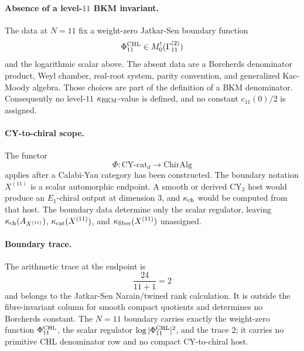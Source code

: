 \paragraph{Absence of a level-\(11\) BKM invariant.}
The data at \(N=11\) fix a weight-zero Jatkar-Sen boundary function
\[
  \Phi^{\mathrm{CHL}}_{11}\in M^{!}_0(\Gamma^{(2)}_{11})
\]
and the logarithmic scalar above. The absent data are a Borcherds
denominator product, Weyl chamber, real-root system, parity convention,
and generalized Kac-Moody algebra. Those choices are part of the
definition of a BKM denominator. Consequently no level-\(11\)
\(\kappa_{\mathrm{BKM}}\)-value is defined, and no constant \(c_{11}(0)/2\) is assigned.

\paragraph{CY-to-chiral scope.}
The functor
\[
  \Phi:\mathrm{CY}\text{-cat}_d\longrightarrow\mathrm{ChirAlg}
\]
applies after a Calabi-Yau category has been constructed. The boundary
notation \(X^{(11)}\) is a scalar automorphic endpoint. A smooth or
derived CY\(_3\) host would produce an \(E_1\)-chiral output at
dimension \(3\), and \(\kappa_{\mathrm{ch}}\) would be computed from that host. The
boundary data determine only the scalar regulator, leaving
\(\kappa_{\mathrm{ch}}(A_{X^{(11)}})\), \(\kappa_{\mathrm{cat}}(X^{(11)})\), and \(\kappa_{\mathrm{fiber}}(X^{(11)})\)
unassigned.

\paragraph{Boundary trace.}
The arithmetic trace at the endpoint is
\[
  \frac{24}{11+1}=2
\]
and belongs to the Jatkar-Sen Narain/twined rank calculation. It is
outside the fibre-invariant column for smooth compact quotients and
determines no Borcherds constant. The \(N=11\) boundary carries exactly
the weight-zero function \(\Phi^{\mathrm{CHL}}_{11}\), the scalar regulator
\(\log|\Phi^{\mathrm{CHL}}_{11}|^2\), and the trace \(2\); it carries no primitive
CHL denominator row and no compact CY-to-chiral host.
